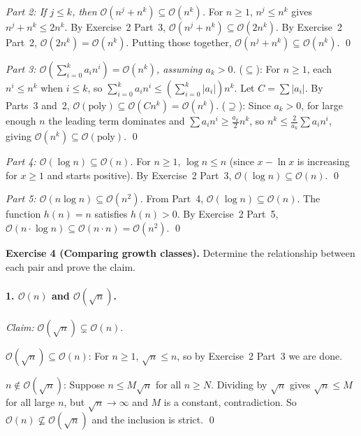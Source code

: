 \documentclass{article}
\theoremstyle{theorem}
\theoremstyle{definition}
\theoremstyle{remark}
\begin{document}
\emph{Part 2: If $j \leq k$, then $\mathcal{O}(n^j + n^k) \subseteq \mathcal{O}(n^k)$.}
For $n \geq 1$, $n^j \leq n^k$ gives $n^j + n^k \leq 2n^k$. By Exercise~2 Part~3, $\mathcal{O}(n^j + n^k) \subseteq \mathcal{O}(2n^k)$. By Exercise~2 Part~2, $\mathcal{O}(2n^k) = \mathcal{O}(n^k)$. Putting those together, $\mathcal{O}(n^j + n^k) \subseteq \mathcal{O}(n^k)$. \qed

\emph{Part 3: $\mathcal{O}\!\left(\sum_{i=0}^{k} a_i n^i\right) = \mathcal{O}(n^k)$, assuming $a_k > 0$.}
($\subseteq$): For $n \geq 1$, each $n^i \leq n^k$ when $i \leq k$, so $\sum_{i=0}^{k} a_i n^i \leq \left(\sum_{i=0}^{k} |a_i|\right) n^k$. Let $C = \sum |a_i|$. By Parts~3 and~2, $\mathcal{O}(\text{poly}) \subseteq \mathcal{O}(Cn^k) = \mathcal{O}(n^k)$. ($\supseteq$): Since $a_k > 0$, for large enough $n$ the leading term dominates and $\sum a_i n^i \geq \frac{a_k}{2} n^k$, so $n^k \leq \frac{2}{a_k} \sum a_i n^i$, giving $\mathcal{O}(n^k) \subseteq \mathcal{O}(\text{poly})$. \qed

\emph{Part 4: $\mathcal{O}(\log n) \subseteq \mathcal{O}(n)$.}
For $n \geq 1$, $\log n \leq n$ (since $x - \ln x$ is increasing for $x \geq 1$ and starts positive). By Exercise~2 Part~3, $\mathcal{O}(\log n) \subseteq \mathcal{O}(n)$. \qed

\emph{Part 5: $\mathcal{O}(n \log n) \subseteq \mathcal{O}(n^2)$.}
From Part~4, $\mathcal{O}(\log n) \subseteq \mathcal{O}(n)$. The function $h(n) = n$ satisfies $h(n) > 0$. By Exercise~2 Part~5, $\mathcal{O}(n \cdot \log n) \subseteq \mathcal{O}(n \cdot n) = \mathcal{O}(n^2)$. \qed

\bigskip

\textbf{Exercise 4 (Comparing growth classes).}
Determine the relationship between each pair and prove the claim.

\paragraph{1. $\mathcal{O}(n)$ and $\mathcal{O}(\sqrt{n})$.}

\emph{Claim:} $\mathcal{O}(\sqrt{n}) \subsetneq \mathcal{O}(n)$.

$\mathcal{O}(\sqrt{n}) \subseteq \mathcal{O}(n)$: For $n \geq 1$, $\sqrt{n} \leq n$, so by Exercise~2 Part~3 we are done.

$n \notin \mathcal{O}(\sqrt{n})$: Suppose $n \leq M\sqrt{n}$ for all $n \geq N$. Dividing by $\sqrt{n}$ gives $\sqrt{n} \leq M$ for all large $n$, but $\sqrt{n} \to \infty$ and $M$ is a constant, contradiction. So $\mathcal{O}(n) \not\subseteq \mathcal{O}(\sqrt{n})$ and the inclusion is strict. \qed
\end{document}

